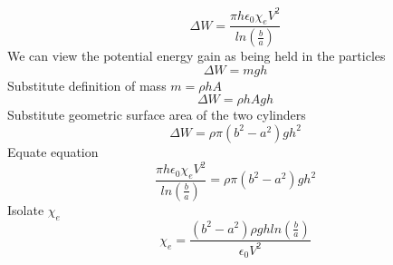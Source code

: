 \documentclass[12pt]{article}
\begin{document}
    \begin{equation} \label{eq: 3-17}
        \Delta W = \frac{\pi h \epsilon_0 \chi_e V^2}{ln(\frac{b}{a})}
    \end{equation}
    We can view the potential energy gain as being held in the particles 
    \begin{equation} \label{eq: 3-18}
        \Delta W = m g h
    \end{equation}
    Substitute definition of mass $m = \rho h A$
    \begin{equation} \label{eq: 3-19}
        \Delta W = \rho h A g h
    \end{equation}
    Substitute geometric surface area of the two cylinders
    \begin{equation} \label{eq: 3-20}
        \Delta W = \rho \pi(b^2 - a^2) g h^2
    \end{equation}
    Equate equation
    \begin{equation} \label{eq: 3-21}
        \frac{\pi h \epsilon_0 \chi_e V^2}{ln(\frac{b}{a})} = \rho \pi(b^2 - a^2) g h^2
    \end{equation}
    Isolate $\chi_e$
    \begin{equation} \label{eq: 3-22}
        \chi_e = \frac{(b^2-a^2) \rho g h ln(\frac{b}{a})}{\epsilon_0 V^2}
    \end{equation}

    
\newpage
\end{document}

